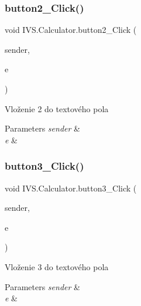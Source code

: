 \subsubsection{\texorpdfstring{button2\+\_\+\+Click()}{button2\_Click()}}
{\footnotesize\ttfamily void I\+V\+S.\+Calculator.\+button2\+\_\+\+Click (\begin{DoxyParamCaption}\item[{object}]{sender,  }\item[{Event\+Args}]{e }\end{DoxyParamCaption})\hspace{0.3cm}{\ttfamily [protected]}}



Vloženie \textquotesingle{}2\textquotesingle{} do textového pola 


\begin{DoxyParams}{Parameters}
{\em sender} & \\
\hline
{\em e} & \\
\hline
\end{DoxyParams}
\mbox{\label{class_i_v_s_1_1_calculator_a4478858fe2f745473de5b68a7a57b2f3}} 
\subsubsection{\texorpdfstring{button3\+\_\+\+Click()}{button3\_Click()}}
{\footnotesize\ttfamily void I\+V\+S.\+Calculator.\+button3\+\_\+\+Click (\begin{DoxyParamCaption}\item[{object}]{sender,  }\item[{Event\+Args}]{e }\end{DoxyParamCaption})\hspace{0.3cm}{\ttfamily [protected]}}



Vloženie \textquotesingle{}3\textquotesingle{} do textového pola 


\begin{DoxyParams}{Parameters}
{\em sender} & \\
\hline
{\em e} & \\
\hline
\end{DoxyParams}
\mbox{\label{class_i_v_s_1_1_calculator_ac1763f222a684150c84c3fe98c0820e1}} 
